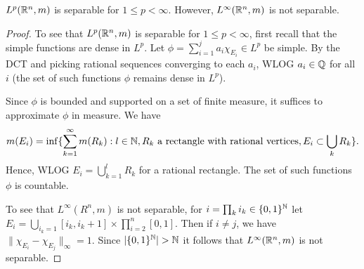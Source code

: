 \documentclass{article}
\begin{document}
 $L^p(\mathbb{R}^n, m)$ is separable for $1 \le p < \infty$. However, $L^\infty(\mathbb{R}^n, m)$ is not separable.
\begin{proof}
To see that $L^p(\mathbb{R}^n, m)$ is separable for $1 \le p < \infty$, first recall that the simple functions are dense in $L^p$.  Let $\phi = \sum_{i=1}^j a_i \chi_{E_i} \in L^p$ be simple. By the DCT and picking rational sequences converging to each $a_i$, WLOG $a_i \in \mathbb{Q}$ for all $i$ (the set of such functions $\phi$ remains dense in $L^p$).

Since $\phi$ is bounded and supported on a set of finite measure, it suffices to approximate $\phi$ in measure. We have 
$$m(E_i) = \inf\{\sum_{k = 1}^\infty m(R_k) : l \in \mathbb{N}, R_k \text{ a rectangle with rational vertices}, E_i \subset \bigcup_k R_k \}.$$ 
 Hence, WLOG $E_i = \bigcup_{k = 1}^l R_k$ for a rational rectangle. The set of such functions $\phi$ is countable.

To see that $L^\infty(R^n, m)$ is not separable, for $i = \prod_k i_k \in \{0,1\}^{\mathbb{N}}$ let $E_i = \bigcup_{i_k = 1} [i_k, i_k + 1] \times \prod_{i=2}^n [0,1]$. Then if $i \neq j$, we have $\|\chi_{E_i} - \chi_{E_j}\|_\infty = 1$.  Since $|\{0,1\}^{\mathbb{N}}| > \mathbb{N}$ it follows that $L^\infty(\mathbb{R}^n, m)$ is not separable.
\end{proof}
\end{document}
